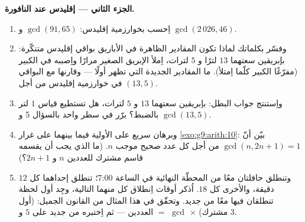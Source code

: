 \begin{problem}
\medskip
\noindent\textbf{الجزء الثاني --- إقليدس عند النافورة.}
\begin{enumerate}[resume]
  \item اِحسب بخوارزمية إقليدس: $\gcd(91, 65)$ و $\gcd(2\,026, 46)$.
  \item وفسّر بكلماتك لماذا تكون المقادير الظاهرة في الأباريق
        بواقي إقليدس متنكّرة: بإبريقين سعتهما $13$ لترًا
        و $5$ لترات، اِملأ الإبريق الصغير مرارًا واِصببه في
        الكبير (مفرّغًا الكبير كلّما اِمتلأ). ما المقادير الجديدة
        التي تظهر أولًا --- وقارنها مع البواقي في خوارزمية
        إقليدس من أجل $(13, 5)$.
  \item واِستنتج جواب البطل: بإبريقين سعتهما $13$ و $5$ لترات، هل
        تستطيع قياس $1$ لتر بالضبط؟ برّر في سطر واحد بالسؤال 5
        و $\gcd(13, 5)$.
  \item وبرهان سريع على الأولية فيما بينهما على غرار
        \cref{exo:g9:arith:10}: بيّن أنّ $\gcd(n, 2n + 1) = 1$ من
        أجل كل عدد صحيح موجب $n$. (ما الذي يجب أن يقسمه
        قاسم مشترك للعددين $n$ و $2n + 1$؟)
  \item وتنطلق حافلتان معًا من المحطّة النهائية في الساعة 7:00؛
        تنطلق إحداهما كل $12$ دقيقة، والأخرى كل $18$. اُذكر أوقات
        اِنطلاق كل منهما التالية، وجِد أول لحظة تنطلقان فيها معًا
        من جديد. وتحقّق في هذا المثال من القانون الجميل: (أول
         مشترك) $\times$ $\gcd$ $=$  العددين ---
        ثم اِختبره من جديد على $5$ و $3$.
\end{enumerate}


\end{problem}

